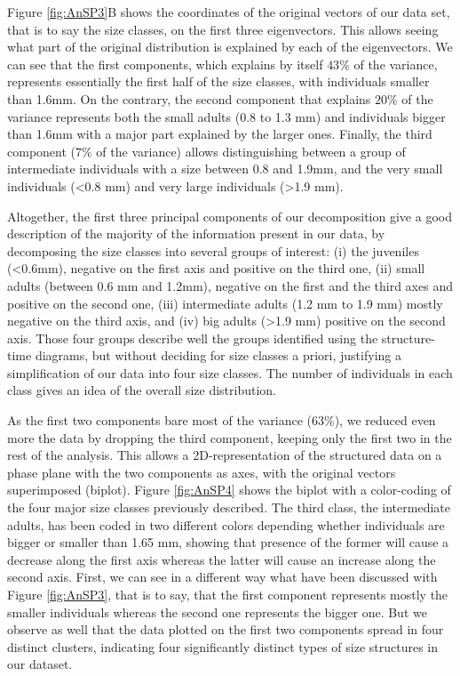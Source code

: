 Figure \ref{fig:AnSP3}B shows the coordinates of the original vectors of our data set, that is
to say the size classes, on the first three eigenvectors. This allows seeing
what part of the original distribution is explained by each of the eigenvectors.
We can see that the first components, which explains by itself $43\%$ of the
variance, represents essentially the first half of the size classes, with
individuals smaller than 1.6mm. On the contrary, the second component that
explains $20\%$ of the variance represents both the small adults (0.8 to 1.3 mm)
and individuals bigger than 1.6mm with a major part explained by the larger
ones. Finally, the third component ($7\%$ of the variance) allows
distinguishing between a group of intermediate individuals with a size between 0.8 and 1.9mm,
and the very small individuals (<0.8 mm) and very large individuals (>1.9 mm).

Altogether, the first three principal components of our decomposition give a
good description of the majority of the information present in our data, by
decomposing the size classes into several groups of interest: (i) the juveniles
(<0.6mm), negative on the first axis and positive on the third one, (ii) small
adults (between 0.6 mm and 1.2mm), negative on the first and the third axes and
positive on the second one, (iii) intermediate adults (1.2 mm to 1.9 mm) mostly
negative on the third axis, and (iv) big adults (>1.9 mm) positive on the second
axis. Those four groups describe well the groups identified using the
structure-time diagrams, but without deciding for size classes a priori,
justifying a simplification of our data into four size classes. The number of
individuals in each class gives an idea of the overall size distribution.

As the first two components bare most of the variance ($63\%$), we reduced even
more the data by dropping the third component, keeping only the first two in the
rest of the analysis. This allows a 2D-representation of the structured data on
a phase plane with the two components as axes, with the original vectors
superimposed (biplot). Figure \ref{fig:AnSP4} shows the biplot with a
color-coding of the four major size classes previously described. The third class, the intermediate
adults, has been coded in two different colors depending whether individuals are
bigger or smaller than 1.65 mm, showing that presence of the former will cause a
decrease along the first axis whereas the latter will cause an increase along
the second axis. First, we can see in a different way what have been discussed
with Figure \ref{fig:AnSP3}, that is to say, that the first component represents mostly the
smaller individuals whereas the second one represents the bigger one. But we
observe as well that the data plotted on the first two components spread in four
distinct clusters, indicating four significantly distinct types of size
structures in our dataset.

